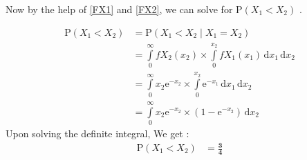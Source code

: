 \documentclass[twocolumn]{article}
\providecommand{\brak}[1]{\ensuremath{\left(#1\right)}}
\begin{document}
Now by the help of \eqref{FX1} and \eqref{FX2}, we can solve for $\mathrm{P} \brak{X_1 < X_2} $ .

\begin{align}
  \mathrm{P}(X_1<X_2) &= \mathrm{P}\brak{X_1 < X_2 \mid X_1 = X_2} \\
  &= \int \limits_{0}^{\infty} fX_2 \brak{x_2} \times \int \limits_{0}^{x_2} fX_1 \brak{x_1} \, \mathrm{d}x_1 \, \mathrm{d}x_2 \\
  &= \int \limits_{0}^{\infty} x_2 \mathrm{e}^{-x_2} \times \int \limits_{0}^{x_2} \mathrm{e}^{-x_1} \, \mathrm{d}x_1 \, \mathrm{d}x_2 \\
  &= \int \limits_{0}^{\infty} x_2 \mathrm{e}^{-x_2} \times \brak{1-\mathrm{e}^{-x_2} } \, \mathrm{d}x_2 
\end{align}
Upon solving the definite integral, We get :
\begin{align}
   \mathrm{P}(X_1<X_2) &= \mathbf{ \frac{3}{4} } 
\end{align}
\end{document}
